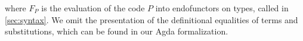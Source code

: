 where $F_P$ is the evaluation of the code $P$ into endofunctors on types, called
   in \cref{sec:syntax}. We omit the presentation of the
definitional equalities of terms and substitutions, which can be found
in our Agda formalization.



%